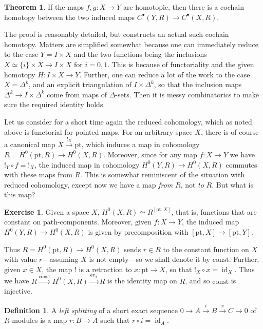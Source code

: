 \documentclass{tufte-handout}
\def\pt {\mathrm{pt}}
\newcommand{\lecturenum}[1]{\marginnote{\color{red}Lecture #1}}
\DeclareMathOperator{\id}{id}
\DeclareMathOperator{\ev}{ev}
\theoremstyle{definition}
\newtheorem{definition}{Definition}
\newtheorem{ex}{Exercise}
\newtheorem{theorem}{Theorem}
\begin{document}
\begin{theorem}
If the maps $f,g\colon X\to Y$ are homotopic, then there is a cochain homotopy between the two induced maps
$C^\bullet(Y,R) \to C^\bullet(X,R)$.
\end{theorem}

The proof is reasonably detailed, but constructs an actual such cochain homotopy. Matters are 
simplified somewhat because one can immediately reduce to the case $Y = I\times X$ and the two 
functions being the inclusions $X\simeq \{i\}\times X \to I\times X$ for $i=0,1$. This is 
because of functoriality and the given homotopy $H\colon I\times X \to Y$. Further, one can reduce 
a lot of the work to the case $X=\Delta^k$, and an explicit triangulation of $I\times \Delta^k$, so
that the inclusion maps $\Delta^k \to I\times \Delta^k$ come from maps of $\Delta$-sets. Then it is messy
combinatorics to make sure the required identity holds.


Let\lecturenum{27} us consider for a short time again the reduced cohomology, which as noted above is functorial for
pointed maps. For an arbitrary space $X$, there is of course a canonical map $X\xrightarrow{!_X} \pt$, which induces a map in cohomology $R=H^0(\pt,R) \to H^0(X,R)$. Moreover, since for any map $f\colon X\to Y$ we have $!_Y \circ f = !_X$, the induced map in cohomology $H^0(Y,R) \to H^0(X,R)$ commutes with these maps from $R$. This is somewhat reminiscent of the situation with reduced cohomology, except now we have a map \emph{from} $R$, not \emph{to} $R$. But what is this map?

\begin{ex}
Given a space $X$, $H^0(X,R) \simeq R^{[\pt,X]}$, that is, functions that are constant on path-components. Moreover, given $f\colon X\to Y$, the induced map $H^0(Y,R) \to H^0(X,R)$ is given by precomposition with $[\pt,X]\to [\pt,Y]$.
\end{ex}

Thus $R = H^0(\pt,R) \to H^0(X,R)$ sends $r\in R$ to the constant function on $X$ with value $r$---assuming $X$ is not empty---so we shall denote it by $\mathrm{const}$. Further, given $x\in X$, the map $!$ is a retraction to $x\colon \pt \to X$, so that $!_X \circ x=\id_X$. Thus we have $R \xrightarrow{\mathrm{const}} H^0(X,R) \xrightarrow{\ev_x} R$ is the identity map on $R$, and so $\mathrm{const}$ is injective.

\begin{definition}
A \emph{left splitting} of a short exact sequence $0\to A \xrightarrow{i} B \xrightarrow{\pi} C \to 0$ of $R$-modules is a map $r\colon B\to A$ such that $r\circ i = \id_A$.
\end{definition}
\end{document}
